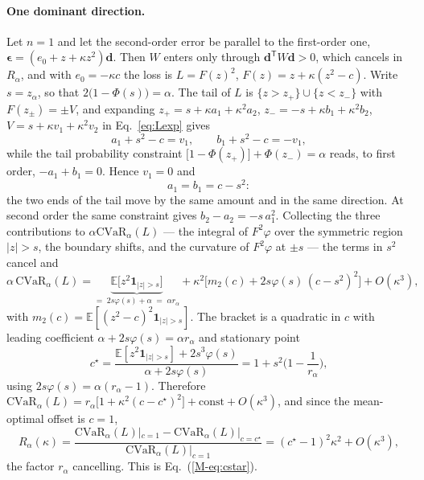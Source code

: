 \documentclass[aps,pra,onecolumn,notitlepage,superscriptaddress,nofootinbib,floatfix]{revtex4-2}
\newcommand{\cvar}{\mathrm{CVaR}}
\newcommand{\E}{\mathbb{E}}
\begin{document}
\paragraph*{One dominant direction.} Let $n=1$ and let the second-order error
be parallel to the first-order one, $\bm\epsilon=(e_0+z+\kappa z^2)\mathbf d$.
Then $W$ enters only through $\mathbf d^{\mathsf T}W\mathbf d>0$, which cancels
in $R_\alpha$, and with $e_0=-\kappa c$ the loss is $L=F(z)^2$,
$F(z)=z+\kappa(z^2-c)$. Write $s=z_\alpha$, so that
$2\big(1-\Phi(s)\big)=\alpha$. The tail of $L$ is
$\{z>z_+\}\cup\{z<z_-\}$ with $F(z_\pm)=\pm V$, and expanding
$z_+=s+\kappa a_1+\kappa^2a_2$, $z_-=-s+\kappa b_1+\kappa^2b_2$,
$V=s+\kappa v_1+\kappa^2v_2$ in Eq.~\eqref{eq:Lexp} gives
\begin{equation*}
a_1+s^2-c=v_1,\qquad b_1+s^2-c=-v_1,
\end{equation*}
while the tail probability constraint
$\big[1-\Phi(z_+)\big]+\Phi(z_-)=\alpha$ reads, to first order,
$-a_1+b_1=0$. Hence $v_1=0$ and
\begin{equation}
a_1=b_1=c-s^2 :
\label{eq:a1}
\end{equation}
the two ends of the tail move by the same amount and in the same direction.
At second order the same constraint gives $b_2-a_2=-s\,a_1^2$. Collecting the
three contributions to $\alpha\cvar_\alpha(L)$ --- the integral of $F^2\varphi$
over the symmetric region $|z|>s$, the boundary shifts, and the curvature of
$F^2\varphi$ at $\pm s$ --- the terms in $s^2$ cancel and
\begin{equation}
\alpha\,\cvar_\alpha(L)=\underbrace{\E\big[z^2\mathbf 1_{|z|>s}\big]}_{=\;2s\varphi(s)+\alpha\;=\;\alpha r_\alpha}
+\kappa^2\Big[m_2(c)+2s\varphi(s)\,(c-s^2)^2\Big]+O(\kappa^3),
\label{eq:scalar}
\end{equation}
with $m_2(c)=\E[(z^2-c)^2\mathbf 1_{|z|>s}]$. The bracket is a quadratic in
$c$ with leading coefficient $\alpha+2s\varphi(s)=\alpha r_\alpha$ and
stationary point
\begin{equation*}
c^\star=\frac{\E[z^2\mathbf 1_{|z|>s}]+2s^3\varphi(s)}{\alpha+2s\varphi(s)}
=1+s^2\Big(1-\frac1{r_\alpha}\Big),
\end{equation*}
using $2s\varphi(s)=\alpha(r_\alpha-1)$. Therefore
$\cvar_\alpha(L)=r_\alpha\big[1+\kappa^2(c-c^\star)^2\big]+\text{const}+O(\kappa^3)$,
and since the mean-optimal offset is $c=1$,
\begin{equation}
R_\alpha(\kappa)=\frac{\cvar_\alpha(L)|_{c=1}-\cvar_\alpha(L)|_{c=c^\star}}{\cvar_\alpha(L)|_{c=1}}
=(c^\star-1)^2\kappa^2+O(\kappa^3),
\end{equation}
the factor $r_\alpha$ cancelling. This is Eq.~(\ref{M-eq:cstar}).
\end{document}
